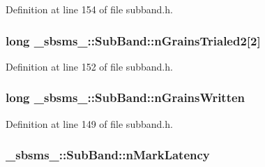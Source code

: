 Definition at line 154 of file subband.\+h.

\subsubsection[{\texorpdfstring{n\+Grains\+Trialed2}{nGrainsTrialed2}}]{\setlength{\rightskip}{0pt plus 5cm}long \+\_\+sbsms\+\_\+\+::\+Sub\+Band\+::n\+Grains\+Trialed2\mbox{[}2\mbox{]}\hspace{0.3cm}{\ttfamily [protected]}}\hypertarget{class__sbsms___1_1_sub_band_a5cf274cd0e5731c644eda6826610b343}{}\label{class__sbsms___1_1_sub_band_a5cf274cd0e5731c644eda6826610b343}


Definition at line 152 of file subband.\+h.

\subsubsection[{\texorpdfstring{n\+Grains\+Written}{nGrainsWritten}}]{\setlength{\rightskip}{0pt plus 5cm}long \+\_\+sbsms\+\_\+\+::\+Sub\+Band\+::n\+Grains\+Written\hspace{0.3cm}{\ttfamily [protected]}}\hypertarget{class__sbsms___1_1_sub_band_a6b0d119fc4e40a34dd26eab7bca7c5e6}{}\label{class__sbsms___1_1_sub_band_a6b0d119fc4e40a34dd26eab7bca7c5e6}


Definition at line 149 of file subband.\+h.

\subsubsection[{\texorpdfstring{n\+Mark\+Latency}{nMarkLatency}}]{ \+\_\+sbsms\+\_\+\+::\+Sub\+Band\+::n\+Mark\+Latency\hspace{0.3cm}{\ttfamily [protected]}}\hypertarget{class__sbsms___1_1_sub_band_aa9855aac2f7afcc30c28b5653ffb87ba}{}\label{class__sbsms___1_1_sub_band_aa9855aac2f7afcc30c28b5653ffb87ba}


